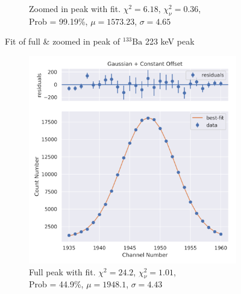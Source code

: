 \documentclass[11pt,a4paper]{article}
\newcommand{\element}[2]{$^{#2}\textrm{#1}$}
\begin{document}
\begin{figure}[H]
\begin{subfigure}{.5\linewidth}
    \caption{Zoomed in peak with fit. $\chi^2 = 6.18$, $\chi^2_\nu = 0.36$, \\ Prob = 99.19\%, $\mu = 1573.23$, $\sigma = 4.65$}
  \end{subfigure}
  \caption{Fit of full \& zoomed in peak of \element{Ba}{133} 223 keV peak}
\end{figure}
\begin{figure}[H]
  \centering
  \begin{subfigure}{.5\linewidth}
    \centering
    \includegraphics[width=\linewidth]{./Images/Barium133/Gauss/Gauss_4_Full.png}
    \caption{Full peak with fit. $\chi^2 = 24.2$, $\chi^2_\nu = 1.01$, \\ Prob = 44.9\%, $\mu = 1948.1$, $\sigma = 4.43$}
  \end{subfigure}%
  \begin{subfigure}{.5\linewidth}
    \centering

\end{subfigure}
\end{figure}
\end{document}
